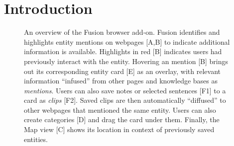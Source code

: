 

\section{Introduction}



\begin{figure}
    \centering
    \caption[An overview of the Fusion browser add-on.]{An overview of the Fusion browser add-on. Fusion identifies and highlights entity mentions on webpages [A,B] to indicate additional information is available. Highlights in red [B] indicates users had previously interact with the entity. Hovering an mention [B] brings out its corresponding entity card [E] as an overlay, with relevant information ``infused'' from other pages and knowledge bases as \emph{mentions}. Users can also save notes or selected sentences [F1] to a card as \emph{clips} [F2]. Saved clips are then automatically ``diffused'' to other webpages that mentioned the same entity. Users can also create categories [D] and drag the card under them. Finally, the Map view [C] shows its location in context of previously saved entities.}
    \label{fig:main_fusion}
\end{figure}


